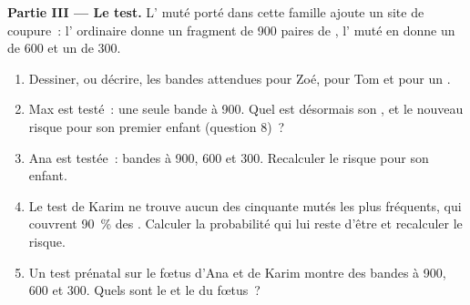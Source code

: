 \begin{problem}
\medskip
\noindent\textbf{Partie III --- Le test.}
L' muté porté dans cette famille ajoute un site de coupure~:
l' ordinaire donne un fragment de 900 paires de , l'
muté en donne un de 600 et un de 300.
\begin{enumerate}[resume]
  \item Dessiner, ou décrire, les bandes attendues pour Zoé, pour Tom
        et pour un .
  \item Max est testé~: une seule bande à 900. Quel est désormais son
        , et le nouveau risque pour son premier enfant
        (question 8)~?
  \item Ana est testée~: bandes à 900, 600 et 300. Recalculer le risque
        pour son enfant.
  \item Le test de Karim ne trouve aucun des cinquante  mutés
        les plus fréquents, qui couvrent 90~\% des . Calculer
        la probabilité qui lui reste d'être  et recalculer le
        risque.
  \item Un test prénatal sur le fœtus d'Ana et de Karim montre des
        bandes à 900, 600 et 300. Quels sont le  et le
         du fœtus~?
\end{enumerate}


\end{problem}
